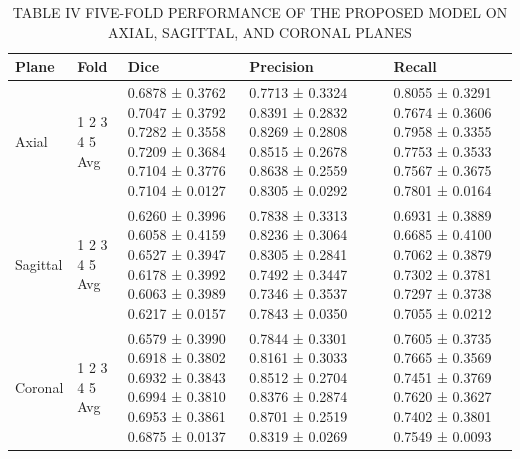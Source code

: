 \begin{table}[htbp]
\centering
\caption{TABLE IV FIVE-FOLD PERFORMANCE OF THE PROPOSED MODEL ON AXIAL, SAGITTAL, AND CORONAL PLANES}
\label{tab:table\_004}
\begin{tabular}{lllll}
\hline
Plane & Fold & Dice & Precision & Recall \\
\hline
Axial & 1 2 3 4 5 Avg & 0.6878 ± 0.3762 0.7047 ± 0.3792 0.7282 ± 0.3558 0.7209 ± 0.3684 0.7104 ± 0.3776 0.7104 ± 0.0127 & 0.7713 ± 0.3324 0.8391 ± 0.2832 0.8269 ± 0.2808 0.8515 ± 0.2678 0.8638 ± 0.2559 0.8305 ± 0.0292 & 0.8055 ± 0.3291 0.7674 ± 0.3606 0.7958 ± 0.3355 0.7753 ± 0.3533 0.7567 ± 0.3675 0.7801 ± 0.0164 \\
Sagittal & 1 2 3 4 5 Avg & 0.6260 ± 0.3996 0.6058 ± 0.4159 0.6527 ± 0.3947 0.6178 ± 0.3992 0.6063 ± 0.3989 0.6217 ± 0.0157 & 0.7838 ± 0.3313 0.8236 ± 0.3064 0.8305 ± 0.2841 0.7492 ± 0.3447 0.7346 ± 0.3537 0.7843 ± 0.0350 & 0.6931 ± 0.3889 0.6685 ± 0.4100 0.7062 ± 0.3879 0.7302 ± 0.3781 0.7297 ± 0.3738 0.7055 ± 0.0212 \\
Coronal & 1 2 3 4 5 Avg & 0.6579 ± 0.3990 0.6918 ± 0.3802 0.6932 ± 0.3843 0.6994 ± 0.3810 0.6953 ± 0.3861 0.6875 ± 0.0137 & 0.7844 ± 0.3301 0.8161 ± 0.3033 0.8512 ± 0.2704 0.8376 ± 0.2874 0.8701 ± 0.2519 0.8319 ± 0.0269 & 0.7605 ± 0.3735 0.7665 ± 0.3569 0.7451 ± 0.3769 0.7620 ± 0.3627 0.7402 ± 0.3801 0.7549 ± 0.0093 \\
\hline
\end{tabular}
\end{table}
